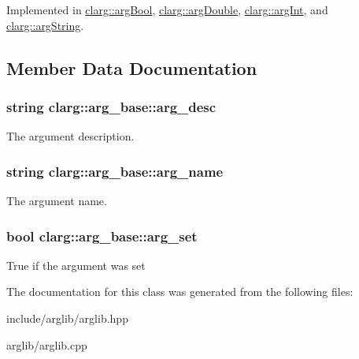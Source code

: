 Implemented in \hyperlink{classclarg_1_1arg_bool_ae254f2a52551c3c811ad08c248d6b4a9}{clarg\+::arg\+Bool}, \hyperlink{classclarg_1_1arg_double_ad4968ff300091cc01022836310ee2383}{clarg\+::arg\+Double}, \hyperlink{classclarg_1_1arg_int_a907539c5963530661a3df01735d39f37}{clarg\+::arg\+Int}, and \hyperlink{classclarg_1_1arg_string_ae336afebabd08c78b5323e1c6eba8ba7}{clarg\+::arg\+String}.



\subsection{Member Data Documentation}
\subsubsection[{\texorpdfstring{arg\+\_\+desc}{arg_desc}}]{\setlength{\rightskip}{0pt plus 5cm}string clarg\+::arg\+\_\+base\+::arg\+\_\+desc\hspace{0.3cm}{\ttfamily [protected]}}\hypertarget{classclarg_1_1arg__base_adef436501e6af061da6e3b0652e43704}{}\label{classclarg_1_1arg__base_adef436501e6af061da6e3b0652e43704}
The argument description. 
\subsubsection[{\texorpdfstring{arg\+\_\+name}{arg_name}}]{\setlength{\rightskip}{0pt plus 5cm}string clarg\+::arg\+\_\+base\+::arg\+\_\+name\hspace{0.3cm}{\ttfamily [protected]}}\hypertarget{classclarg_1_1arg__base_af0e1e1240bd9779d84d2b4d9f078f9e2}{}\label{classclarg_1_1arg__base_af0e1e1240bd9779d84d2b4d9f078f9e2}
The argument name. 
\subsubsection[{\texorpdfstring{arg\+\_\+set}{arg_set}}]{\setlength{\rightskip}{0pt plus 5cm}bool clarg\+::arg\+\_\+base\+::arg\+\_\+set\hspace{0.3cm}{\ttfamily [protected]}}\hypertarget{classclarg_1_1arg__base_a897ba15feb1390687d072acae6c69512}{}\label{classclarg_1_1arg__base_a897ba15feb1390687d072acae6c69512}
True if the argument was set 

The documentation for this class was generated from the following files\+:\begin{DoxyCompactItemize}
\item 
include/arglib/arglib.\+hpp\item 
arglib/arglib.\+cpp\end{DoxyCompactItemize}
